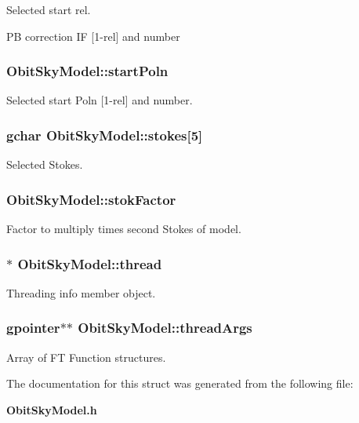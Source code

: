 Selected start rel. 

PB correction IF [1-rel] and number 
\subsubsection{ {\bf Obit\-Sky\-Model::start\-Poln}}\label{structObitSkyModel_o43}


Selected start Poln [1-rel] and number. 

\subsubsection{\setlength{\rightskip}{0pt plus 5cm}gchar {\bf Obit\-Sky\-Model::stokes}[5]}\label{structObitSkyModel_o42}


Selected Stokes. 

\subsubsection{ {\bf Obit\-Sky\-Model::stok\-Factor}}\label{structObitSkyModel_o22}


Factor to multiply times second Stokes of model. 

\subsubsection{$\ast$ {\bf Obit\-Sky\-Model::thread}}\label{structObitSkyModel_o4}


Threading info member object. 

\subsubsection{\setlength{\rightskip}{0pt plus 5cm}gpointer$\ast$$\ast$ {\bf Obit\-Sky\-Model::thread\-Args}}\label{structObitSkyModel_o54}


Array of FT Function structures. 



The documentation for this struct was generated from the following file:\begin{CompactItemize}
\item 
{\bf Obit\-Sky\-Model.h}\end{CompactItemize}
